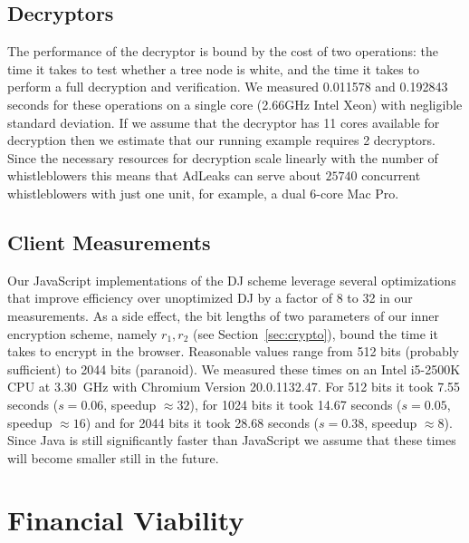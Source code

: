 \documentclass[twocolumn,10pt]{article}
\newcommand{\Ktestmean}{0.011578}
\newcommand{\Kdecmean}{0.192843}
\newcommand{\Kodjlmean}{7.55}
\newcommand{\Kodjmmean}{14.67}
\newcommand{\Kodjhmean}{28.68}
\newcommand{\Kodjlsdev}{0.06}
\newcommand{\Kodjmsdev}{0.05}
\newcommand{\Kodjhsdev}{0.38}
\newcommand{\Kcores}{11}
\newcommand{\Kunitsiii}{2}
\newcommand{\Kunitwb}{25740}
\begin{document}
\subsection{Decryptors}

The performance of the decryptor is bound by the cost of two operations: the
time it takes to test whether a tree node is white, and the time it takes to
perform a full decryption and verification.  We measured \Ktestmean{} and
\Kdecmean{} seconds for these operations on a single core (2.66GHz Intel
Xeon) with negligible standard deviation.  If we assume that the decryptor
has \Kcores{} cores available for decryption then we estimate that our
running example requires \Kunitsiii{} decryptors.  Since the necessary
resources for decryption scale linearly with the number of whistleblowers
this means that AdLeaks can serve about $\Kunitwb$ concurrent whistleblowers
with just one unit, for example, a dual 6-core Mac Pro.


\subsection{Client Measurements}

Our JavaScript implementations of the DJ scheme leverage several
optimizations~\cite{Jurik2003} that improve efficiency over unoptimized DJ
by a factor of 8 to 32 in our measurements. As a side effect, the bit
lengths of two parameters of our inner encryption scheme, namely $r_1,r_2$
(see Section~\ref{sec:crypto}), bound the time it takes to encrypt in the
browser.  Reasonable values range from 512 bits (probably sufficient) to
2044 bits (paranoid).  We measured these times on an Intel i5-2500K CPU at
3.30~GHz with Chromium Version 20.0.1132.47.  For 512 bits it took
\Kodjlmean{} seconds ($s=\Kodjlsdev$, speedup $\approx 32$), for 1024 bits
it took \Kodjmmean{} seconds ($s=\Kodjmsdev$, speedup $\approx 16$) and for
2044 bits it took \Kodjhmean{} seconds ($s=\Kodjhsdev$, speedup $\approx
8$).  Since Java is still significantly faster than JavaScript we assume
that these times will become smaller still in the future.


\section{Financial Viability}
\label{sec:financial}
\end{document}
